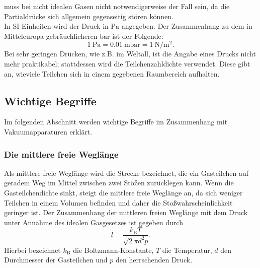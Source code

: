 muss bei nicht idealen Gasen nicht notwendigerweise der Fall sein, da die Partialdrücke
sich allgemein gegenseitig stören können.\\
In SI-Einheiten wird der Druck in $\si{\pascal}$ angegeben. Der Zusammenhang zu dem
in Mitteleuropa gebräuchlicheren $\si{\bar}$ ist der Folgende:
\begin{equation}
 \SI{1}{\pascal} = \SI{0.01}{\milli\bar} = \SI{1}{\newton\per\square\meter}.
\end{equation}
Bei sehr geringen Drücken, wie z.B. im Weltall, ist die Angabe eines Drucks nicht
mehr praktikabel; stattdessen wird die Teilchenzahldichte verwendet. Diese gibt an,
wieviele Teilchen sich in einem gegebenen Raumbereich aufhalten.

\subsection{Wichtige Begriffe}
Im folgenden Abschnitt werden wichtige Begriffe im Zusammenhang mit Vakuumapparaturen
erklärt.

\subsubsection*{Die mittlere freie Weglänge}
Als mittlere freie Weglänge wird die Strecke bezeichnet, die ein Gasteilchen
auf geradem Weg im Mittel zwischen zwei Stößen zurücklegen kann. Wenn die Gasteilchendichte
sinkt, steigt die mittlere freie Weglänge an, da sich weniger Teilchen in einem Volumen befinden
und daher die Stoßwahrscheinlichkeit geringer ist. Der Zusammenhang der mittleren freien
Weglänge mit dem Druck unter Annahme des idealen Gasgesetzes ist gegeben durch
\begin{equation}
 \bar{l} = \frac{k_{\text{B}}T}{\sqrt{2}\pi d^{2} p}.
\end{equation}
Hierbei bezeichnet $k_{\text{B}}$ die Boltzmann-Konstante, $T$ die Temperatur, $d$ den
Durchmesser der Gasteilchen und $p$ den herrschenden Druck.

